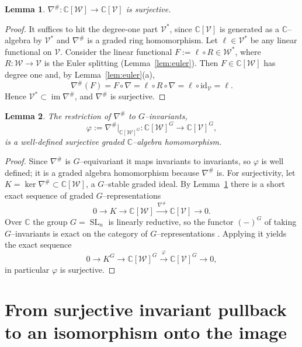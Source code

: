 \documentclass{amsart}
\newtheorem{lemma}{Lemma}
\theoremstyle{definition}
\DeclareMathOperator{\SL}{SL}
\DeclareMathOperator{\im}{im}
\newcommand{\CC}{\mathbb{C}}
\newcommand{\nab}{\nabla}
\begin{document}
\begin{lemma}\label{lem:nabsharp-surj}
$\nab^{\#}\colon \CC[\mathcal W]\to\CC[\mathcal V]$ is surjective.
\end{lemma}

\begin{proof}
It suffices to hit the degree-one part $\mathcal V^{*}$, since $\CC[\mathcal V]$ is generated
as a $\CC$--algebra by $\mathcal V^{*}$ and $\nab^{\#}$ is a graded ring homomorphism.
Let $\ell\in\mathcal V^{*}$ be any linear functional on $\mathcal V$. Consider the linear
functional $F:=\ell\circ R\in\mathcal W^{*}$, where $R\colon\mathcal W\to\mathcal V$ is the
Euler splitting (Lemma~\ref{lem:euler}). Then $F\in\CC[\mathcal W]$ has degree one and, by
Lemma~\ref{lem:euler}(a),
\[
\nab^{\#}(F)=F\circ\nab=\ell\circ R\circ\nab=\ell\circ\mathrm{id}_{\mathcal V}=\ell .
\]
Hence $\mathcal V^{*}\subset\im\nab^{\#}$, and $\nab^{\#}$ is surjective.
\end{proof}

\begin{lemma}\label{lem:phi-surj}
The restriction of $\nab^{\#}$ to $G$--invariants,
\[
\varphi:=\nab^{\#}|_{\CC[\mathcal W]^{G}}\colon \CC[\mathcal W]^{G}\longrightarrow
\CC[\mathcal V]^{G},
\]
is a well-defined surjective graded $\CC$--algebra homomorphism.
\end{lemma}

\begin{proof}
Since $\nab^{\#}$ is $G$--equivariant it maps invariants to invariants, so $\varphi$ is
well defined; it is a graded algebra homomorphism because $\nab^{\#}$ is. For surjectivity,
let $K=\ker\nab^{\#}\subset\CC[\mathcal W]$, a $G$--stable graded ideal. By
Lemma~\ref{lem:nabsharp-surj} there is a short exact sequence of graded
$G$--representations
\[
0\to K\to \CC[\mathcal W]\xrightarrow{\ \nab^{\#}\ }\CC[\mathcal V]\to 0 .
\]
Over $\CC$ the group $G=\SL_n$ is linearly reductive, so the functor $(-)^{G}$ of taking
$G$--invariants is exact on the category of $G$--representations
\cite[Ch.~1, \S 2]{MFK}. Applying it yields the exact sequence
\[
0\to K^{G}\to \CC[\mathcal W]^{G}\xrightarrow{\ \varphi\ }\CC[\mathcal V]^{G}\to 0 ,
\]
in particular $\varphi$ is surjective.
\end{proof}

\section{From surjective invariant pullback to an isomorphism onto the image}\label{sec:proj}
\end{document}

